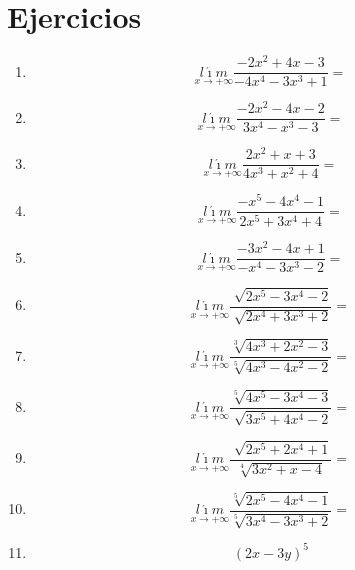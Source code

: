 \documentclass[oneside,spanish,letter]{article}
\begin{document}
\section{Ejercicios}
\begin{enumerate}
 \item $$\underset{x\rightarrow +\infty}{l\acute{\imath}m} \frac{-2x^2+4x-3}{-4x^4-3x^3+1}=$$
 \item $$\underset{x\rightarrow +\infty}{l\acute{\imath}m} \frac{-2x^2-4x-2}{3x^4-x^3-3}=$$
 \item $$\underset{x\rightarrow +\infty}{l\acute{\imath}m} \frac{2x^2+x+3}{4x^3+x^2+4}=$$
 \item $$\underset{x\rightarrow +\infty}{l\acute{\imath}m} \frac{-x^5-4x^4-1}{2x^5+3x^4+4}=$$
 \item $$\underset{x\rightarrow +\infty}{l\acute{\imath}m} \frac{-3x^2-4x+1}{-x^4-3x^3-2}=$$
 \item $$\underset{x\rightarrow +\infty}{l\acute{\imath}m} \frac{\sqrt[]{2x^5-3x^4-2}}{\sqrt[]{2x^4+3x^3+2}}=$$
 \item $$\underset{x\rightarrow +\infty}{l\acute{\imath}m} \frac{\sqrt[3]{4x^3+2x^2-3}}{\sqrt[5]{4x^3-4x^2-2}}=$$
 \item $$\underset{x\rightarrow +\infty}{l\acute{\imath}m} \frac{\sqrt[5]{4x^5-3x^4-3}}{\sqrt[]{3x^5+4x^4-2}}=$$
 \item $$\underset{x\rightarrow +\infty}{l\acute{\imath}m} \frac{\sqrt[]{2x^5+2x^4+1}}{\sqrt[4]{3x^2+x-4}}=$$
 \item $$\underset{x\rightarrow +\infty}{l\acute{\imath}m} \frac{\sqrt[5]{2x^5-4x^4-1}}{\sqrt[5]{3x^4-3x^3+2}}=$$
\item $$(2x-3y)^5$$
 \end{enumerate}
  \newpage
\end{document}
